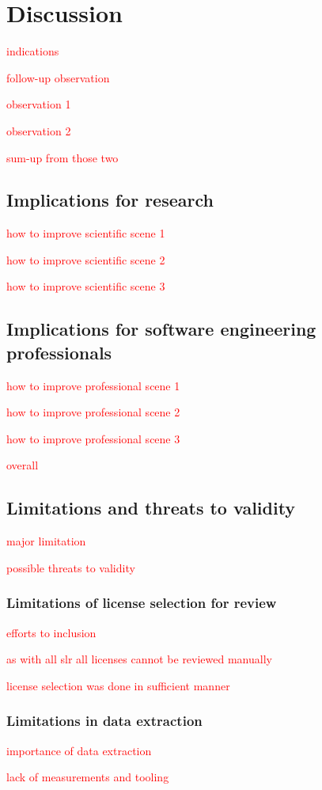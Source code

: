 \chapter{Discussion\label{discussion}}

\textcolor{red}{indications}

\textcolor{red}{follow-up observation}

\textcolor{red}{observation 1}

\textcolor{red}{observation 2}

\textcolor{red}{sum-up from those two}


\section{Implications for research}

\textcolor{red}{how to improve scientific scene 1}

\textcolor{red}{how to improve scientific scene 2}

\textcolor{red}{how to improve scientific scene 3}


\section{Implications for software engineering professionals}

\textcolor{red}{how to improve professional scene 1}

\textcolor{red}{how to improve professional scene 2}

\textcolor{red}{how to improve professional scene 3}

\textcolor{red}{overall}


\section{Limitations and threats to validity}

\textcolor{red}{major limitation}

\textcolor{red}{possible threats to validity}


\subsection{Limitations of license selection for review}

\textcolor{red}{efforts to inclusion}

\textcolor{red}{as with all slr all licenses cannot be reviewed manually}

\textcolor{red}{license selection was done in sufficient manner}


\subsection{Limitations in data extraction}

\textcolor{red}{importance of data extraction}

\textcolor{red}{lack of measurements and tooling}
